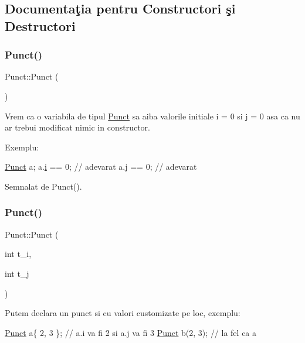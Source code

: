 \subsection{Documentaţia pentru Constructori şi Destructori}
\mbox{\label{structPunct_a04070b9c9925f7f4a117ecec3d3338af}} 
\subsubsection{\texorpdfstring{Punct()}{Punct()}\hspace{0.1cm}{\footnotesize\ttfamily [1/3]}}
{\footnotesize\ttfamily Punct\+::\+Punct (\begin{DoxyParamCaption}{ }\end{DoxyParamCaption})\hspace{0.3cm}{\ttfamily [default]}}

Vrem ca o variabila de tipul \hyperlink{structPunct}{Punct} sa aiba valorile initiale i = 0 si j = 0 asa ca nu ar trebui modificat nimic in constructor.

Exemplu\+: 
\begin{DoxyCode}
\hyperlink{structPunct}{Punct} a;
a.\hyperlink{structPunct_a28bb6f2facdfadbf7e19d651c526a646}{i} == 0; \textcolor{comment}{// adevarat}
a.\hyperlink{structPunct_a065a30931a1d15d6f6c638c4888d254e}{j} == 0; \textcolor{comment}{// adevarat}
\end{DoxyCode}
 

Semnalat de Punct().

\mbox{\label{structPunct_a2ff34bc87cb16eae3d747ff63d51bff0}} 
\subsubsection{\texorpdfstring{Punct()}{Punct()}\hspace{0.1cm}{\footnotesize\ttfamily [2/3]}}
{\footnotesize\ttfamily Punct\+::\+Punct (\begin{DoxyParamCaption}\item[{int}]{t\+\_\+i,  }\item[{int}]{t\+\_\+j }\end{DoxyParamCaption})\hspace{0.3cm}{\ttfamily [inline]}}

Putem declara un punct si cu valori customizate pe loc, exemplu\+: 
\begin{DoxyCode}
\hyperlink{structPunct}{Punct} a\{ 2, 3 \}; \textcolor{comment}{// a.i va fi 2 si a.j va fi 3}
\hyperlink{structPunct}{Punct} b(2, 3); \textcolor{comment}{// la fel ca a}
\end{DoxyCode}
 

